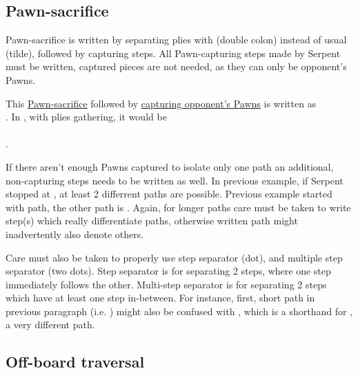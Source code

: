 \subsection*{Pawn-sacrifice}
\label{sec:Appendix/Pawn-sacrifice}

Pawn-sacrifice is written by separating plies with \alg{::} (double colon) instead of usual \alg{\~{}} (tilde),
followed by capturing steps. All Pawn-capturing steps made by Serpent must be written, captured pieces are not
needed, as they can only be opponent's Pawns.

This \hyperref[fig:scn_tr_21_pawn_sacrifice_init]{Pawn-sacrifice} followed by
\hyperref[fig:scn_tr_22_pawn_sacrifice_end]{capturing opponent's Pawns} is written as \\
. In , with plies gathering, it would be \\
\alg{[Sr14-m15]\~{}[Am15-m11]::}\\
\alg{[Sm15..m17*..m19*.l20*.m21*.n20*.o21*]}.

If there aren't enough Pawns captured to isolate only one path an additional, non-capturing steps needs to be
written as well. In previous example, if Serpent stopped at , at least 2 differrent paths are possible.
Previous example started with  path, the other path is .
Again, for longer paths care must be taken to write step(s) which really differentiate paths, otherwise written
path might inadvertently also denote others.

Care must also be taken to properly use step separator  (dot), and multiple step separator  (two
dots). Step separator  is for separating 2 steps, where one step immediately follows the other. Multi-step
separator  is for separating 2 steps which have at least one step in-between. For instance, first, short
path in previous paragraph (i.e. ) might also be confused with
, which is a shorthand for , a very
different path.

\subsection*{Off-board traversal}
\label{sec:Appendix/Off-board traversal}

